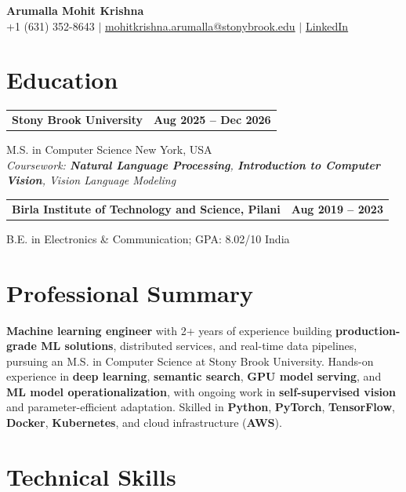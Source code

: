\documentclass[letterpaper,10pt]{article}
\makeatletter
\newcommand{\entry}[2]{%
  \noindent
  \begin{tabularx}{\linewidth}
    {@{}>{\raggedright\arraybackslash}X@{\hspace{6pt}}r@{}}
    \textbf{#1} & #2
  \end{tabularx}\par
}
\makeatother
\begin{document}
\begin{center}
    {\LARGE\bfseries Arumalla Mohit Krishna}\\[3pt]
    +1 (631) 352-8643 $|$
    \href{mailto:mohitkrishna.arumalla@stonybrook.edu}
    {mohitkrishna.arumalla@stonybrook.edu} $|$
    \href{https://linkedin.com/in/mohit-krishna-arumalla}
    {LinkedIn}
\end{center}
\vspace{-8pt}

\section{Education}

\entry
  {\textbf{Stony Brook University}}
  {\textbf{Aug 2025 -- Dec 2026}}

M.S. in Computer Science \hfill New York, USA\\
\textit{
Coursework: \textbf{Natural Language Processing},
\textbf{Introduction to Computer Vision}, Vision Language Modeling
}
\vspace{3pt}

\entry
  {\textbf{Birla Institute of Technology and Science, Pilani}}
  {\textbf{Aug 2019 -- 2023}}

B.E. in Electronics \& Communication; GPA: 8.02/10 \hfill India
\section{Professional Summary}

\textbf{Machine learning engineer} with 2+ years of experience building \textbf{production-grade ML solutions}, distributed services, and real-time data pipelines, pursuing an M.S. in Computer Science at Stony Brook University. Hands-on experience in \textbf{deep learning}, \textbf{semantic search}, \textbf{GPU model serving}, and \textbf{ML model operationalization}, with ongoing work in \textbf{self-supervised vision} and parameter-efficient adaptation. Skilled in \textbf{Python}, \textbf{PyTorch}, \textbf{TensorFlow}, \textbf{Docker}, \textbf{Kubernetes}, and cloud infrastructure (\textbf{AWS}).

\section{Technical Skills}
\end{document}
